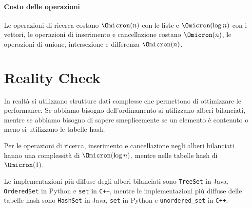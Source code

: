\paragraph{Costo delle operazioni}
Le operazioni di ricerca costano \(\Omicron(n)\) con le liste e \(\Omicron(\log n)\) con i vettori, le operazioni di inserimento e cancellazione costano \(\Omicron(n)\), le operazioni di unione, intersezione e differenza \(\Omicron(n)\).

\section{Reality Check}

In realtà si utilizzano strutture dati complesse che permettono di ottimizzare le performance.
Se abbiamo bisogno dell'ordinamento si utilizzano alberi bilanciati, mentre se abbiamo bisogno di sapere smeplicemente se un elemento è contenuto o meno si utilizzano le tabelle hash.

\medskip
Per le operazioni di ricerca, inserimento e cancellazione negli alberi bilanciati hanno una complessità di \(\Omicron(\log n)\), mentre nelle tabelle hash di \(\Omicron(1)\).

\medskip
Le implementazioni più diffuse degli alberi bilanciati sono \texttt{TreeSet} in Java, \texttt{OrderedSet} in Python e \texttt{set} in \texttt{C++}, mentre le implementazioni più diffuse delle tabelle hash sono \texttt{HashSet} in Java, \texttt{set} in Python e \texttt{unordered\_set} in \texttt{C++}.

